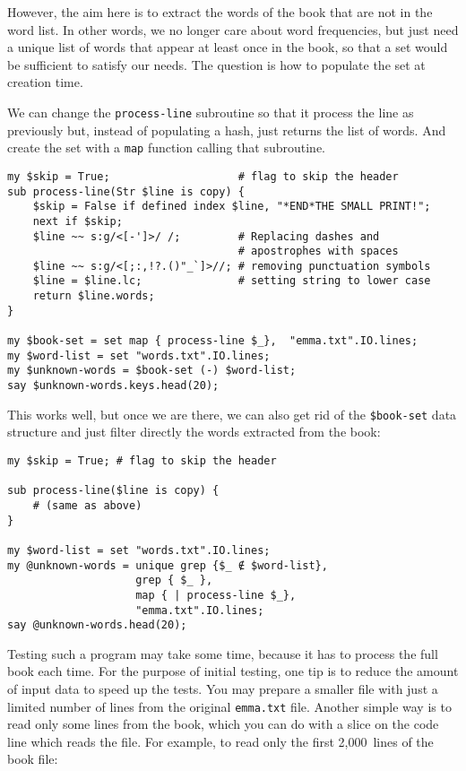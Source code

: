 {However, the aim here is to extract the words of the book that 
are not in the word list. In other words, we no longer care 
about word frequencies, but just need a unique list of words 
that appear at least once in the book, so that a set would 
be sufficient to satisfy our needs. The question is how to 
populate the set at creation time.

We can change the {\tt process-line} subroutine so that it 
process the line as previously but, instead of populating a 
hash, just returns the list of words. And create the set 
with a {\tt map} function calling that subroutine.

\begin{verbatim}
my $skip = True;                    # flag to skip the header
sub process-line(Str $line is copy) {
    $skip = False if defined index $line, "*END*THE SMALL PRINT!";
    next if $skip;
    $line ~~ s:g/<[-']>/ /;         # Replacing dashes and 
                                    # apostrophes with spaces
    $line ~~ s:g/<[;:,!?.()"_`]>//; # removing punctuation symbols
    $line = $line.lc;               # setting string to lower case
    return $line.words;
}

my $book-set = set map { process-line $_},  "emma.txt".IO.lines; 
my $word-list = set "words.txt".IO.lines;
my $unknown-words = $book-set (-) $word-list;
say $unknown-words.keys.head(20);
\end{verbatim}

This works well, but once we are there, we can also 
get rid of the \verb'$book-set' data structure and 
just filter directly the words extracted from the book:

\begin{verbatim}
my $skip = True; # flag to skip the header

sub process-line($line is copy) {
    # (same as above)
}

my $word-list = set "words.txt".IO.lines;
my @unknown-words = unique grep {$_ ∉ $word-list}, 
                    grep { $_ }, 
                    map { | process-line $_},  
                    "emma.txt".IO.lines; 
say @unknown-words.head(20);
\end{verbatim}

Testing such a program may take some time, because it has to 
process the full book each time. For the purpose of initial 
testing, one tip is to reduce the amount of input 
data to speed up the tests. You may prepare a smaller file with 
just a limited number of lines from the original {\tt emma.txt} 
file. Another simple way is to read only some lines from the 
book, which you can do with a slice on the code line which 
reads the file. For example, to read only the first 2,000~lines 
of the book file:

}
